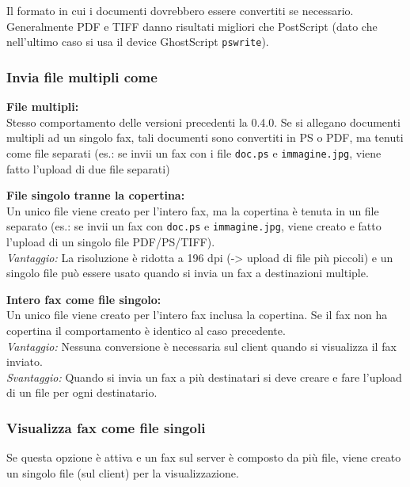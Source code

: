 \documentclass[a4paper,10pt]{scrartcl}
\begin{document}
Il formato in cui i documenti dovrebbero essere convertiti se necessario. Generalmente PDF e TIFF danno risultati migliori che PostScript (dato che nell'ultimo caso si usa il device GhostScript \texttt{pswrite}).

\subsubsection{Invia file multipli come}

{\parindent0pt
\textbf{File multipli:}\\
Stesso comportamento delle versioni precedenti la 0.4.0. Se si allegano documenti multipli ad un singolo fax, tali documenti sono convertiti in PS o PDF, ma tenuti come file separati (es.: se invii un fax con i file \texttt{doc.ps} e \texttt{immagine.jpg}, viene fatto l'upload di due file separati)
\medskip

\textbf{File singolo tranne la copertina:}\\
Un unico file viene creato per l'intero fax, ma la copertina è tenuta in un file separato (es.: se invii un fax con \texttt{doc.ps} e \texttt{immagine.jpg}, viene creato e fatto l'upload di un singolo file PDF/PS/TIFF).\\
\textit{Vantaggio:} La risoluzione è ridotta a 196 dpi (-> upload di file più piccoli) e un singolo file può essere usato quando si invia un fax a destinazioni multiple.
\medskip

\textbf{Intero fax come file singolo:}\\
Un unico file viene creato per l'intero fax inclusa la copertina. Se il fax non ha copertina il comportamento è identico al caso precedente.\\
\textit{Vantaggio:} Nessuna conversione è necessaria sul client quando si visualizza il fax inviato.\\
\textit{Svantaggio:} Quando si invia un fax a più destinatari si deve creare e fare l'upload di un file per ogni destinatario.
}

\subsubsection{Visualizza fax come file singoli}
Se questa opzione è attiva e un fax sul server è composto da più file, viene creato un singolo file (sul client) per la visualizzazione.
\end{document}
